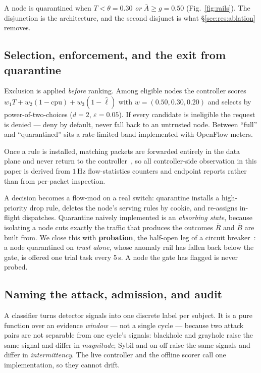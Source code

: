 \documentclass[10pt,twocolumn,letterpaper]{article}
\newcommand{\Tscore}{T}
\newcommand{\Agate}{\bar{A}}
\begin{document}
A node is quarantined when $\Tscore < \theta = 0.30$ \emph{or}
$\Agate \ge g = 0.50$ (Fig.~\ref{fig:rails}). The disjunction is the
architecture, and the second disjunct is what \S\ref{sec:res:ablation} removes.

\subsection{Selection, enforcement, and the exit from quarantine}
Exclusion is applied \emph{before} ranking. Among eligible nodes the controller
scores $w_1 \Tscore + w_2(1-\mathrm{cpu}) + w_3(1-\widehat{\ell})$ with
$w = (0.50, 0.30, 0.20)$ and selects by power-of-two-choices ($d{=}2$,
$\varepsilon = 0.05$). If every candidate is ineligible the request is denied ---
deny by default, never fall back to an untrusted node. Between ``full'' and
``quarantined'' sits a rate-limited band implemented with OpenFlow meters.

Once a rule is installed, matching packets are forwarded entirely in the data
plane and never return to the controller~\cite{mckeown2008openflow}, so all
controller-side observation in this paper is derived from $1$\,Hz flow-statistics
counters and endpoint reports rather than from per-packet inspection.

A decision becomes a flow-mod on a real switch: quarantine installs a
high-priority drop rule, deletes the node's serving rules by cookie, and
re-assigns in-flight dispatches. Quarantine naively implemented is an
\emph{absorbing state}, because isolating a node cuts exactly the traffic that
produces the outcomes $\bar{R}$ and $\bar{B}$ are built from. We close this with
\textbf{probation}, the half-open leg of a circuit
breaker~\cite{nygard2018releaseit}: a node quarantined on \emph{trust alone},
whose anomaly rail has fallen back below the gate, is offered one trial task
every $5$\,s. A node the gate has flagged is never probed.

\subsection{Naming the attack, admission, and audit}
A classifier turns detector signals into one discrete label per subject. It is
a pure function over an evidence \emph{window} --- not a single cycle --- because
two attack pairs are not separable from one cycle's signals: blackhole and
grayhole raise the same signal and differ in \emph{magnitude}; Sybil and on-off
raise the same signals and differ in \emph{intermittency}. The live controller
and the offline scorer call one implementation, so they cannot drift.
\end{document}
